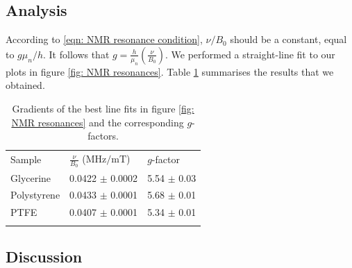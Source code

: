 \documentclass[a4paper]{jpconf}
\numberwithin{equation}{section}
\begin{document}
\subsection{Analysis}
According to \eqref{eqn: NMR resonance condition}, $\nu / B_0$ should be a constant, equal to $g \mu_n/h$. It follows that $ g = \frac{h}{\mu_n} \left( \frac{\nu}{B_0} \right)$. We performed a straight-line fit to our plots in figure \ref{fig: NMR resonances}. Table \ref{table: g-factors} summarises the results that we obtained.

\begin{table}[htbp]
	\caption{\label{table: g-factors} Gradients of the best line fits in figure \ref{fig: NMR resonances} and the corresponding $g$-factors.}
	\begin{center}
		\begin{tabular}{lll}
			\br
			Sample&$\frac{\nu}{B_0} $ ($\si{\mega\hertz\per\milli\tesla}$) & $g$-factor \\
			\mr
			Glycerine & 0.0422 $\pm$ 0.0002 & 5.54 $\pm$ 0.03\\
			Polystyrene&0.0433 $\pm$ 0.0001&5.68 $\pm$ 0.01\\
			PTFE&0.0407 $\pm$ 0.0001&5.34 $\pm$ 0.01\\
			\br
		\end{tabular}
	\end{center}
\end{table}

\subsection{Discussion}
\end{document}
